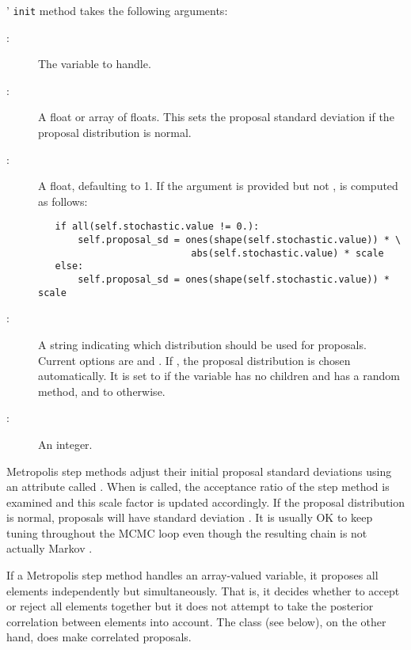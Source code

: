 ' \texttt{init} method takes the following arguments:
\begin{description}
   \item[:] The variable to handle.
   \item[:] A float or array of floats. This sets the proposal standard deviation if the proposal distribution is normal.
   \item[:] A float, defaulting to 1. If the  argument is provided but not ,  is computed as follows:
   \begin{verbatim}
   if all(self.stochastic.value != 0.):
       self.proposal_sd = ones(shape(self.stochastic.value)) * \
                           abs(self.stochastic.value) * scale
   else:
       self.proposal_sd = ones(shape(self.stochastic.value)) * scale
   \end{verbatim}
   \item[:] A string indicating which distribution should be used for proposals. Current options are  and . If , the proposal distribution is chosen automatically. It is set to  if the variable has no children and has a random method, and to  otherwise.
   \item[\code{verbose}:] An integer.
\end{description}

Metropolis step methods adjust their initial proposal standard deviations using an attribute called . When  is called, the acceptance ratio of the step method is examined and this scale factor is updated accordingly. If the proposal distribution is normal, proposals will have standard deviation . It is usually OK to keep tuning throughout the MCMC loop even though the resulting chain is not actually Markov \citep{tuning}. %

If a Metropolis step method handles an array-valued variable, it proposes all elements independently but simultaneously. That is, it decides whether to accept or reject all elements together but it does not attempt to take the posterior correlation between elements into account. The  class (see below), on the other hand, does make correlated proposals.

